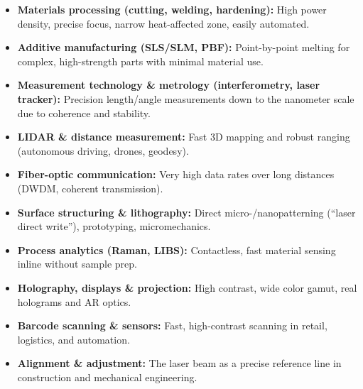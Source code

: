 \begin{tcolorbox}[didaktikbox, title={Applications of Lasers — Technology (Overview)}]	
	\label{box:lasertechnik}
	\begin{itemize}
		\item \textbf{Materials processing (cutting, welding, hardening):} High power density, precise focus, narrow heat-affected zone, easily automated.
		\item \textbf{Additive manufacturing (SLS/SLM, PBF):} Point-by-point melting for complex, high-strength parts with minimal material use.
		\item \textbf{Measurement technology \& metrology (interferometry, laser tracker):} Precision length/angle measurements down to the nanometer scale due to coherence and stability.
		\item \textbf{LIDAR \& distance measurement:} Fast 3D mapping and robust ranging (autonomous driving, drones, geodesy).
		\item \textbf{Fiber-optic communication:} Very high data rates over long distances (DWDM, coherent transmission).
		\item \textbf{Surface structuring \& lithography:} Direct micro-/nanopatterning (“laser direct write”), prototyping, micromechanics.
		\item \textbf{Process analytics (Raman, LIBS):} Contactless, fast material sensing inline without sample prep.
		\item \textbf{Holography, displays \& projection:} High contrast, wide color gamut, real holograms and AR optics.
		\item \textbf{Barcode scanning \& sensors:} Fast, high-contrast scanning in retail, logistics, and automation.
		\item \textbf{Alignment \& adjustment:} The laser beam as a precise reference line in construction and mechanical engineering.
	\end{itemize}
\end{tcolorbox}


